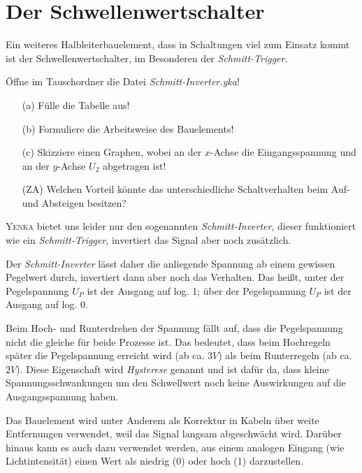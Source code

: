 \section[Der Schwellenwertschalter (Zusatzwissen)]{Der Schwellenwertschalter}
\begin{ZW}
Ein weiteres Halbleiterbauelement, dass in Schaltungen viel zum Einsatz kommt ist der Schwellenwertschalter, im Besonderen der \emph{Schmitt-Trigger}.

\begin{Aufgabe} \label{Aufg:SchmittTest}
Öffne im Tauschordner die Datei \emph{Schmitt-Inverter.yka}!
\begin{itemize}
\item[(a)] Fülle die Tabelle aus!
\item[(b)] Formuliere die Arbeitsweise des Bauelements!
\item[(c)] Skizziere einen Graphen, wobei an der $x$-Achse die Eingangsspannung und an der $y$-Achse $U_2$ abgetragen ist!
\item[(ZA)] Welchen Vorteil könnte das unterschiedliche Schaltverhalten beim Auf- und Absteigen besitzen?
\end{itemize}
\end{Aufgabe}



\textsc{Yenka} bietet uns leider nur den sogenannten \emph{Schmitt-Inverter}, dieser funktioniert wie ein \emph{Schmitt-Trigger}, invertiert das Signal aber noch zusätzlich.

Der \emph{Schmitt-Inverter} lässt daher die anliegende Spannung ab einem gewissen Pegelwert durch, invertiert dann aber noch das Verhalten. Das heißt, unter der Pegelspannung $U_P$ ist der Ausgang auf log. 1; über der Pegelspannung $U_P$ ist der Ausgang auf log. 0.

\par \hfill \par

Beim Hoch- und Runterdrehen der Spannung fällt auf, dass die Pegelspannung nicht die gleiche für beide Prozesse ist.
Das bedeutet, dass beim Hochregeln später die Pegelspannung erreicht wird (ab ca. $3V$) als beim Runterregeln (ab ca. $2V$). Diese Eigenschaft wird \emph{Hysterese} genannt und ist dafür da, dass kleine Spannungsschwankungen um den Schwellwert noch keine Auswirkungen auf die Ausgangsspannung haben.

Das Bauelement wird unter Anderem als Korrektur in Kabeln über weite Entfernungen verwendet, weil das Signal langsam abgeschwächt wird. Darüber hinaus kann es auch dazu verwendet werden, aus einem analogen Eingang (wie Lichtintensität) einen Wert als niedrig (0) oder hoch (1) darzustellen.



\end{ZW}
